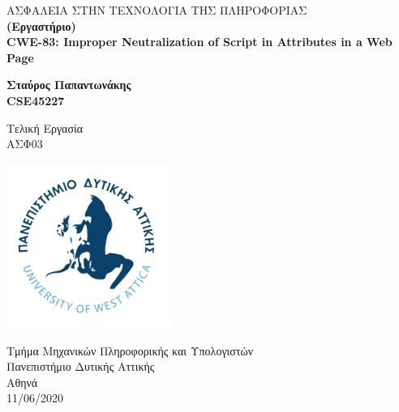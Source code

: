 %
%
%
\begin{titlepage}
	\begin{center}
		ΑΣΦΑΛΕΙΑ ΣΤΗΝ ΤΕΧΝΟΛΟΓΙΑ ΤΗΣ ΠΛΗΡΟΦΟΡΙΑΣ\\
		\textbf{(Εργαστήριο)}\\

		\vspace{1cm}	
		\Large%
		\textbf{CWE-83: Improper Neutralization of Script in Attributes in a Web Page}
		
		\vspace{0.5cm}
		\large
		
				
		\vspace{1.5cm}
		\textbf{Σταύρος Παπαντωνάκης\\ CSE45227}
		\vfill
		
		Τελική Εργασία\\
		ΑΣΦ03
		\vspace{0.8cm}
		\begin{center}
			\includegraphics[width=0.4\textwidth]{image/logo.jpg}		
		\end{center}
		\normalsize
		Τμήμα Μηχανικών Πληροφορικής και Υπολογιστών\\
		Πανεπιστήμιο Δυτικής Αττικής\\
		Αθηνά\\
		11/06/2020\\	
	\end{center}
\end{titlepage}